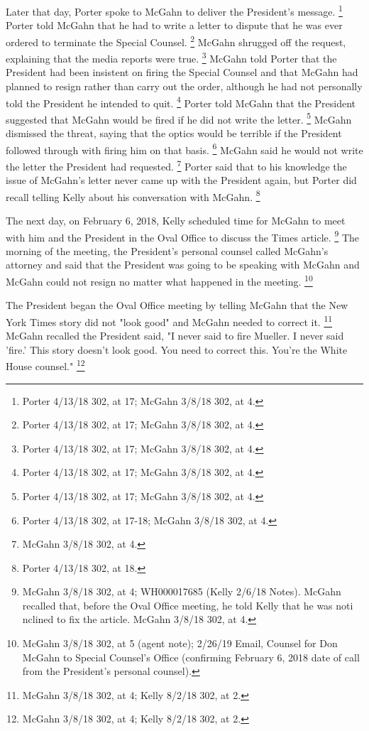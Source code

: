 {Later that day, Porter spoke to McGahn to deliver the President's message.%
\footnote{Porter 4/13/18 302, at 17;
McGahn 3/8/18 302, at 4.}
Porter told McGahn that he had to write a letter to dispute that he was ever ordered to terminate the Special Counsel.%
\footnote{Porter 4/13/18 302, at 17;
McGahn 3/8/18 302, at 4.}
McGahn shrugged off the request, explaining that the media reports were true.%
\footnote{Porter 4/13/18 302, at 17;
McGahn 3/8/18 302, at 4.}
McGahn told Porter that the President had been insistent on firing the Special Counsel and that McGahn had planned to resign rather than carry out the order, although he had not personally told the President he intended to quit.%
\footnote{Porter 4/13/18 302, at 17;
McGahn 3/8/18 302, at 4.}
Porter told McGahn that the President suggested that McGahn would be fired if he did not write the letter.%
\footnote{Porter 4/13/18 302, at 17;
McGahn 3/8/18 302, at 4.}
McGahn dismissed the threat, saying that the optics would be terrible if the President followed through with firing him on that basis.%
\footnote{Porter 4/13/18 302, at 17-18;
McGahn 3/8/18 302, at 4.}
McGahn said he would not write the letter the President had requested.%
\footnote{McGahn 3/8/18 302, at 4.}
Porter said that to his knowledge the issue of McGahn's letter never came up with the President again, but Porter did recall telling Kelly about his conversation with McGahn.%
\footnote{Porter 4/13/18 302, at 18.}

The next day, on February 6, 2018, Kelly scheduled time for McGahn to meet with him and the President in the Oval Office to discuss the Times article.%
\footnote{McGahn 3/8/18 302, at 4;
WH000017685 (Kelly 2/6/18 Notes).
McGahn recalled that, before the Oval Office meeting, he told Kelly that he was noti nclined to fix the article.
McGahn 3/8/18 302, at 4.}
The morning of the meeting, the President's personal counsel called McGahn's attorney and said that the President was going to be speaking with McGahn and McGahn could not resign no matter what happened in the meeting.%
\footnote{McGahn 3/8/18 302, at 5 (agent note);
2/26/19 Email, Counsel for Don McGahn to Special Counsel’s Office (confirming February 6, 2018 date of call from the President’s personal counsel).}

The President began the Oval Office meeting by telling McGahn that the New York Times story did not "look good" and McGahn needed to correct it.%
\footnote{McGahn 3/8/18 302, at 4; Kelly 8/2/18 302, at 2.}
McGahn recalled the President said, "I never said to fire Mueller.
I never said 'fire.'
This story doesn't look good.
You need to correct this.
You're the White House counsel."%
\footnote{McGahn 3/8/18 302, at 4; Kelly 8/2/18 302, at 2.}

}
